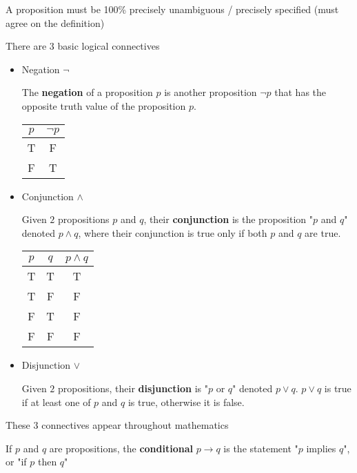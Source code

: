 \documentclass[11pt]{scrartcl}
\begin{document}
\begin{remark}
    A proposition must be 100\% precisely unambiguous / precisely specified (must agree on the definition)
\end{remark}
There are $3$ basic logical connectives
\begin{itemize}
    \item Negation $\neg$ \begin{definition}[negation]
        The \textbf{negation} of a proposition $p$ is another proposition $\neg p$ that has the opposite truth value of the proposition $p$.
    \end{definition}
\begin{center}
\begin{tabular}{|c|c|}
\hline
$p$ & $\neg p$\\
\hline
T & F\\
\hline 
F & T\\
\hline
\end{tabular}
\end{center}
    \item Conjunction $\wedge$ \begin{definition}[conjunction]
        Given $2$ propositions $p$ and $q$, their \textbf{conjunction} is the proposition "$p$ and $q$" denoted $p \wedge q$, where their conjunction is true only if both $p$ and $q$ are true.
    \end{definition}
\begin{center}
    \begin{tabular}{|c|c|c|}
         \hline
         $p$&$q$&$p\wedge q$  \\
         \hline
         T & T & T\\\hline
         T&F&F\\ \hline
         F&T&F\\ \hline
         F&F&F\\ \hline
    \end{tabular}
\end{center}
    \item Disjunction $\vee$ \begin{definition}[disjunction]
        Given $2$ propositions, their \textbf{disjunction} is "$p$ or $q$" denoted $p\vee q$.  $p\vee q$ is true if at least one of $p$ and $q$ is true, otherwise it is false.
    \end{definition}
\end{itemize}
These $3$ connectives appear throughout mathematics
\begin{definition}[conditional]
    If $p$ and $q$ are propositions, the \textbf{conditional} $p \rightarrow q$ is the statement "$p$ implies $q$", or "if $p$ then $q$"
\end{definition}
\end{document}
